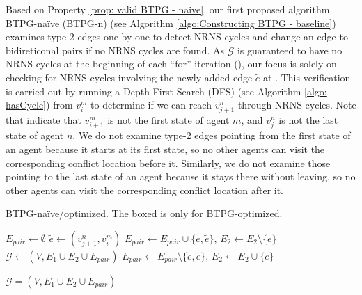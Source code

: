 \documentclass[letterpaper]{article} %
\theoremstyle{definition}
\begin{document}
Based on Property \ref{prop: valid BTPG - naive}, our first proposed algorithm BTPG-naïve (BTPG-n) (see Algorithm \ref{algo:Constructing BTPG - baseline}) examines type-2 edges one by one to detect NRNS cycles and change an edge to bidireticonal pairs if no NRNS cycles are found. As $\mathcal{G}$ is guaranteed to have no NRNS cycles at the beginning of each ``for'' iteration (), our focus is solely on checking for NRNS cycles involving the newly added edge $\tilde{e}$ at . This verification is carried out by running a Depth First Search (DFS) (see Algorithm \ref{algo: hasCycle}) from $v_{i}^m$ to determine if we can reach $v_{j+1}^n$ through NRNS cycles. 
Note that  indicate that $v_{i+1}^m$ is not the first state of agent $m$, and $v_{j}^n$ is not the last state of agent $n$. We do not examine type-2 edges pointing from the first state of an agent because it starts at its first state, so no other agents can visit the corresponding conflict location before it. Similarly, we do not examine those pointing to the last state of an agent because it stays there without leaving, so no other agents can visit the corresponding conflict location after it.
\begin{algorithm}[t!]
        \caption{BTPG-naïve/optimized. The boxed  is only for BTPG-optimized.}
        
        \label{algo:Constructing BTPG - baseline}
        
        \LinesNumbered
        \texttt{$E_{pair} \gets \emptyset$}
        \While{\label{line:Epair-updated}}
        {
            {
                \texttt{$\tilde{e} \gets (v_{j+1}^n, v_{i}^m)$}\label{line:e-tilde}
                $E_{pair} \gets E_{pair} \cup \{e,\tilde{e}\}$,
                $E_2 \gets E_2 \setminus \{e\}$\;
                $\mathcal{G}\gets(V,E_1 \cup E_2 \cup E_{pair})$\;
                { 
                    $E_{pair} \gets E_{pair} \setminus \{e,\tilde{e}\}$,
                    $E_2 \gets E_2 \cup \{e\}$\;
                 }
            }
        }
        
        \Return $\mathcal{G}=(V,E_1 \cup E_2 \cup E_{pair})$\;
\end{algorithm}
\end{document}
